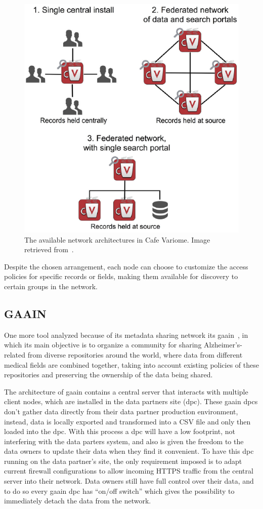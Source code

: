 \begin{figure}[H]
    \centering
    \includegraphics[width=.5\linewidth]{cafevariome-network.png}
    \caption{The available network architectures in Cafe Variome. Image retrieved from~\cite{cafevariome}.}
\end{figure}

Despite the chosen arrangement, each node can choose to customize the access policies for specific records or fields, making them available for discovery to certain groups in the network.

\subsection*{GAAIN}
One more tool analyzed because of its metadata sharing network its \gls{gaain}~\cite{gaain}, in which its main objective is to organize a community for sharing Alzheimer's-related from diverse repositories around the world, where data from different medical fields are combined together, taking into account existing policies of these repositories and preserving the ownership of the data being shared.

The architecture of \gls{gaain} contains a central server that interacts with multiple client nodes, which are installed in the data partners site (\gls{dpc}).
These \gls{gaain} \gls{dpc}s don't gather data directly from their data partner production environment, instead, data is locally exported and transformed into a CSV file and only then loaded into the \gls{dpc}.
With this process a \gls{dpc} will have a low footprint, not interfering with the data parters system, and also is given the freedom to the data owners to update their data when they find it convenient.
To have this \gls{dpc} running on the data partner's site, the only requirement imposed is to adapt current firewall configurations to allow incoming HTTPS traffic from the central server into their network.
Data owners still have full control over their data, and to do so every \gls{gaain} \gls{dpc} has ``on/off switch'' which gives the possibility to immediately detach the data from the network.

